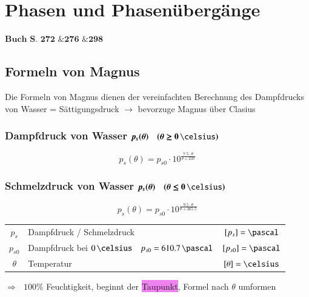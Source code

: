 \section{Phasen und Phasenübergänge}

\begin{flushright}
	$\boxed{\textbf{Buch S. 272 \& 276 \& 298}}$
\end{flushright}

\subsection{Formeln von Magnus}

Die Formeln von Magnus dienen der vereinfachten Berechnung des Dampfdrucks von Wasser = Sättigungsdruck $\rightarrow$ bevorzuge Magnus über Clasius

\subsubsection{Dampfdruck von Wasser $\boldsymbol{p_s(\theta) \quad (\theta \geq 0 \, \celsius)}$}

\vspace{-0.2cm}

$$ \boxed{ p_s(\theta) = p_{s0} \cdot 10^{ \frac{7.5 \cdot \theta}{\theta + 237} } } $$



\subsubsection{Schmelzdruck von Wasser $\bm{p_s(\theta) \quad (\theta \leq 0 \, \celsius)}$}

\vspace{-0.2cm}

$$ \boxed{ p_s(\theta) = p_{s0} \cdot 10^{ \frac{9.5 \cdot \theta}{\theta + 265.5} } } $$


\begin{tabular}{c l c}
	$p_s$ 		& Dampfdruck / Schmelzdruck 									& $[p_s] = \pascal$ 	\\
	$p_{s0}$ 	& Dampfdruck bei $0\, \celsius \quad p_{s0} = 610.7 \, \pascal$	& $[p_{s0}] = \pascal$	\\
	$\theta$ 	& Temperatur 													& $[\theta] = \celsius$
	
\end{tabular}


$\Rightarrow ~~~100\%$ Feuchtigkeit, beginnt der \colorbox{violet}{Taupunkt}, Formel nach $\theta$ umformen

